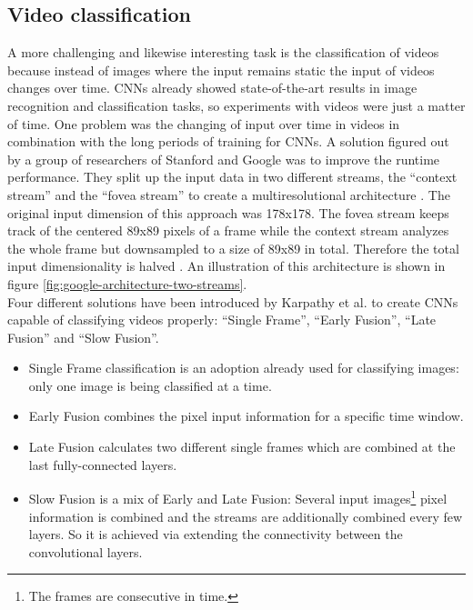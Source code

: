 \documentclass[12pt,twoside]{article}
\theoremstyle{plain}
\theoremstyle{definition}
\theoremstyle{remark}
\begin{document}
\subsection{Video classification}

A more challenging and likewise interesting task is the classification of videos because instead of images where the input remains static the input of videos changes over time.
CNNs already showed state-of-the-art results in image recognition and classification tasks, so experiments with videos were just a matter of time. One problem was the changing of input over time in videos in combination with the long periods of training for CNNs. A solution figured out by a group of researchers of Stanford and Google was to improve the runtime performance. They split up the input data in two different streams, the \enquote{context stream} and the \enquote{fovea stream} to create a multiresolutional architecture \cite{GoogleLargeScaleVideoClassification-Karpathy}.
The original input dimension of this approach was 178x178. The fovea stream keeps track of the centered 89x89 pixels of a frame while the context stream analyzes the whole frame but downsampled to a size of 89x89 in total. Therefore the total input dimensionality is halved \cite{GoogleLargeScaleVideoClassification-Karpathy}. An illustration of this architecture is shown in figure \ref{fig:google-architecture-two-streams}.
\\
Four different solutions have been introduced by Karpathy et al. \cite{GoogleLargeScaleVideoClassification-Karpathy} to create CNNs capable of classifying videos properly: \enquote{Single Frame}, \enquote{Early Fusion}, \enquote{Late Fusion} and \enquote{Slow Fusion}.
\begin{itemize}
	\item Single Frame classification is an adoption already used for classifying images: only one image is being classified at a time.
	\item Early Fusion combines the pixel input information for a specific time window.
	\item Late Fusion calculates two different single frames which are combined at the last fully-connected layers.
	\item Slow Fusion is a mix of Early and Late Fusion: Several input images\footnote{The frames are consecutive in time.} pixel information  is combined and the streams are additionally combined every few layers. So it is achieved via extending the connectivity between the convolutional layers.
\end{itemize}
\end{document}
